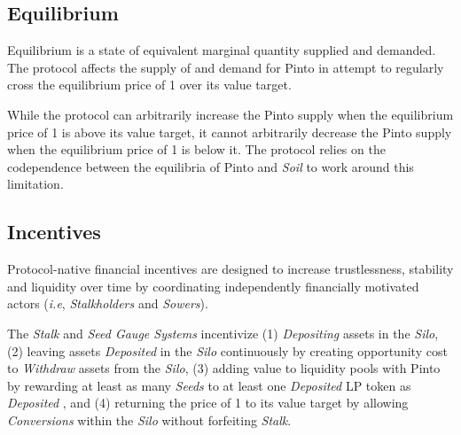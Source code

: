 \documentclass[tikz]{article}
\newcommand{\term}[1]{\textsl{#1}}
\newcommand{\Pinto}{} %
\renewcommand{\Pinto}{\usebox{\cachePinto}}
\begin{document}

\subsection{Equilibrium}
\vspace{-0.15cm}

Equilibrium is a state of equivalent marginal quantity supplied and demanded. The protocol affects the supply of and demand for Pinto in attempt to regularly cross the equilibrium price of \Pinto1 over its value target. 

\vspace{-0.15cm}

While the protocol can arbitrarily increase the Pinto supply when the equilibrium price of \Pinto1 is above its value target, it cannot arbitrarily decrease the Pinto supply when the equilibrium price of \Pinto1 is below it. The protocol relies on the codependence between the equilibria of Pinto and \term{Soil} to work around this limitation. 


\vspace{-0.15cm}
\subsection{Incentives}
\vspace{-0.15cm}

Protocol-native financial incentives are designed to increase trustlessness, stability and liquidity over time by coordinating independently financially motivated actors (\textit{i.e}, \term{Stalkholders} and \term{Sowers}). 

\vspace{-0.15cm}

The \term{Stalk} and \term{Seed Gauge Systems} incentivize (1) \term{Depositing} assets in the \term{Silo}, (2) leaving assets \term{Deposited} in the \term{Silo} continuously by creating opportunity cost to \term{Withdraw} assets from the \term{Silo}, (3) adding value to liquidity pools with Pinto by rewarding at least as many \term{Seeds} to at least one \term{Deposited} LP token as \term{Deposited} \Pinto, and (4) returning the price of \Pinto1 to its value target by allowing \term{Conversions} within the \term{Silo} without forfeiting \term{Stalk}.

\vspace{-0.15cm}
\end{document}

